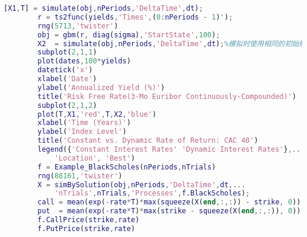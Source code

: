 \begin{lstlisting}[language= Matlab]
        [X1,T] = simulate(obj,nPeriods,'DeltaTime',dt);
        r = ts2func(yields,'Times',(0:nPeriods - 1)');
        rng(5713,'twister')
        obj = gbm(r, diag(sigma),'StartState',100);
        X2  = simulate(obj,nPeriods,'DeltaTime',dt);%模拟时使用相同的初始随机数
        subplot(2,1,1)
        plot(dates,100*yields)
        datetick('x')
        xlabel('Date')
        ylabel('Annualized Yield (%)')
        title('Risk Free Rate(3-Mo Euribor Continuously-Compounded)')
        subplot(2,1,2)
        plot(T,X1,'red',T,X2,'blue')
        xlabel('Time (Years)')
        ylabel('Index Level')
        title('Constant vs. Dynamic Rate of Return: CAC 40')
        legend({'Constant Interest Rates' 'Dynamic Interest Rates'},...
            'Location', 'Best')
        f = Example_BlackScholes(nPeriods,nTrials)
        rng(88161,'twister')
        X = simBySolution(obj,nPeriods,'DeltaTime',dt,...
            'nTrials',nTrials,'Processes',f.BlackScholes);
        call = mean(exp(-rate*T)*max(squeeze(X(end,:,:)) - strike, 0))
        put  = mean(exp(-rate*T)*max(strike - squeeze(X(end,:,:)), 0))
        f.CallPrice(strike,rate)
        f.PutPrice(strike,rate)
        \end{lstlisting}

